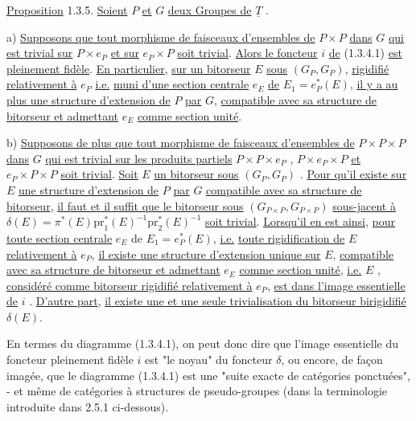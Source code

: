 \underline{Proposition} 1.3.5. \underline{Soient} $P$ \underline{et} $G$ \underline{deux Groupes de} $\underline{T}$ .

a)  \underline{Supposons que tout morphisme de faisceaux d'ensembles de} $P\times P$ \underline{dans} $G$ \underline{qui est trivial sur} $P\times e_P$ \underline{et sur} $e_P\times P$ \underline{soit trivial}. \underline{Alors le foncteur} $i$ \underline{de} (1.3.4.1) \underline{est pleinement fidèle}. \underline{En particulier}, \underline{sur un bitorseur} $E$ \underline{sous} $(G_P,G_P)$, \underline{rigidifié relativement à} $e_P$ \underline{i.e.} \underline{muni d'une section centrale} $e_E$ \underline{de} $E_1 = e_P^*(E)$, \underline{il y a au plus une structure d'extension de} $P$ \underline{par} $G$, \underline{compatible avec sa structure de bitorseur et admettant} $e_E$ \underline{comme section unité}.

b)  \underline{Supposons de plus que tout morphisme de faisceaux d'ensembles de} $P\times P\times P$ \underline{dans} $G$ \underline{qui est trivial sur les produits partiels} $P\times P\times e_P$ , $P\times e_P\times P$ \underline{et} $e_P\times P\times P$ \underline{soit trivial}. \underline{Soit} $E$ \underline{un bitorseur sous} $(G_P,G_P)$ . \underline{Pour qu'il existe sur} $E$ \underline{une structure d'extension de} $P$ \underline{par} $G$ \underline{compatible avec sa structure de bitorseur}, \underline{il faut et il suffit que le bitorseur sous} $(G_{P\times P},G_{P\times P})$ \underline{sous-jacent à} $\delta(E) = \pi^*(E)\mathrm{pr}_1^*(E)^{-1}\mathrm{pr}_2^*(E)^{-1}$ \underline{soit trivial}. \underline{Lorsqu'il en est ainsi}, \underline{pour toute section centrale} $e_E$ de $E_1 = e_P^*(E)$, \underline{i.e.} \underline{toute rigidification de} $E$ \underline{relativement à} $e_P$, \underline{il existe une structure d'extension unique sur} $E$, \underline{compatible avec sa structure de bitorseur et admettant} $e_E$ \underline{comme section unité}, \underline{i.e.} $E$ , \underline{considéré comme bitorseur rigidifié relativement à} $e_P$, \underline{est dans l'image essentielle de} $i$ . \underline{D'autre part}, \underline{il existe une et une seule trivialisation du bitorseur birigidifié} $\delta(E)$.



En termes du diagramme (1.3.4.1), on peut donc dire que l'image essentielle du foncteur pleinement fidèle $i$ est "le noyau" du foncteur $\delta$, ou encore, de façon imagée, que le diagramme (1.3.4.1) est une "suite exacte de catégories ponctuées", - et même de catégories à structures de pseudo-groupes (dans la terminologie introduite dans 2.5.1 ci-dessous).

